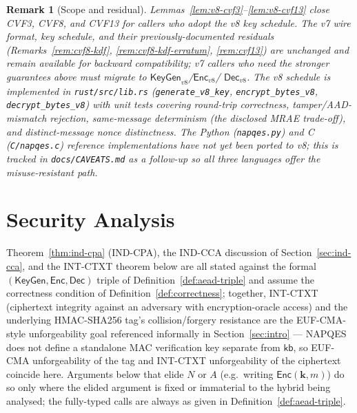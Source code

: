 \documentclass[11pt,a4paper]{article}
\newtheorem{remark}[theorem]{Remark}
\begin{document}
\begin{remark}[Scope and residual]
\label{rem:v8-scope}
Lemmas~\ref{lem:v8-cvf3}--\ref{lem:v8-cvf13} close CVF3, CVF8, and CVF13
for callers who adopt the v8 key schedule. The v7 wire format, key
schedule, and their previously-documented residuals (Remarks~\ref{rem:cvf8-kdf},
\ref{rem:cvf8-kdf-erratum}, \ref{rem:cvf13}) are unchanged and remain
available for backward compatibility; v7 callers who need the stronger
guarantees above must migrate to $\mathsf{KeyGen}_{v8}$/$\mathsf{Enc}_{v8}$/
$\mathsf{Dec}_{v8}$. The v8 schedule is implemented in
\texttt{rust/src/lib.rs} (\texttt{generate\_v8\_key},
\texttt{encrypt\_bytes\_v8}, \texttt{decrypt\_bytes\_v8}) with unit tests
covering round-trip correctness, tamper/AAD-mismatch rejection,
same-message determinism (the disclosed MRAE trade-off), and
distinct-message nonce distinctness. The Python (\texttt{napqes.py}) and C
(\texttt{C/napqes.c}) reference implementations have not yet been ported
to v8; this is tracked in \texttt{docs/CAVEATS.md} as a follow-up so all
three languages offer the misuse-resistant path.
\end{remark}

\section{Security Analysis}
\label{sec:security}

Theorem~\ref{thm:ind-cpa} (IND-CPA), the IND-CCA discussion of
Section~\ref{sec:ind-cca}, and the INT-CTXT theorem below are all stated
against the formal $(\mathsf{KeyGen}, \mathsf{Enc}, \mathsf{Dec})$ triple of
Definition~\ref{def:aead-triple} and assume the correctness condition of
Definition~\ref{def:correctness}; together, INT-CTXT (ciphertext integrity
against an adversary with encryption-oracle access) and the underlying
HMAC-SHA256 tag's collision/forgery resistance are the EUF-CMA-style
unforgeability goal referenced informally in Section~\ref{sec:intro} —
NAPQES does not define a standalone MAC verification key separate from
$\mathsf{kb}$, so EUF-CMA unforgeability of the tag and INT-CTXT
unforgeability of the ciphertext coincide here. Arguments below that elide
$N$ or $A$ (e.g.\ writing $\mathsf{Enc}(\mathbf{k}, m)$) do so only where the
elided argument is fixed or immaterial to the hybrid being analysed;
the fully-typed calls are always as given in Definition~\ref{def:aead-triple}.
\end{document}
